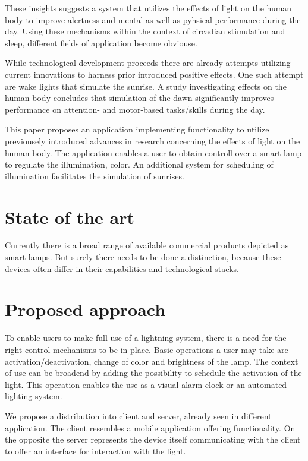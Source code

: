 \documentclass[conference]{IEEEtran}
\begin{document}
These insights suggests a system that utilizes the effects of light on the human body to improve alertness and mental as well as
pyhsical performance during the day. Using these mechanisms within the context of circadian stimulation and sleep, different
fields of application become obviouse.

While technological development proceeds there are already attempts utilizing current innovations to harness prior introduced 
positive effects. One such attempt are wake lights that simulate the sunrise. A study investigating effects on the human body
concludes that simulation of the dawn significantly improves performance on attention- and motor-based tasks/skills during the day.
\cite{Gabel2015a}

This paper proposes an application implementing functionality to utilize previousely introduced advances in research 
concerning the effects of light on the human body. The application enables a user to obtain controll over a smart lamp
to regulate the illumination, color. An additional system for scheduling of illumination facilitates the simulation of sunrises.

\section{State of the art}
Currently there is a broad range of available commercial products depicted as smart lamps. But surely there needs to be done a
distinction, because these devices often differ in their capabilities and technological stacks. 


\section{Proposed approach}
To enable users to make full use of a lightning system, there is a need for the right control mechanisms to be in place.
Basic operations a user may take are activation/deactivation, change of color and brightness of the lamp. The context of use can be broadend 
by adding the possibility to schedule the activation of the light. This operation enables the use as a visual alarm clock or an automated
lighting system. 

We propose a distribution into client and server, already seen in different application. The client resembles a mobile application
offering functionality. On the opposite the server represents the device itself communicating with the client to offer an interface for
interaction with the light.
\end{document}
